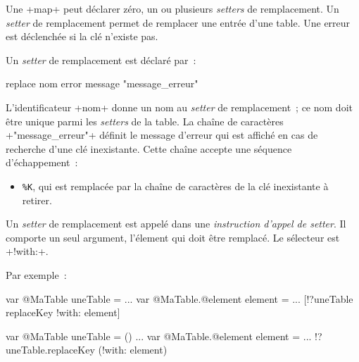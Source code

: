 Une \ggst+map+ peut déclarer zéro, un ou plusieurs \emph{setters} de remplacement. Un \emph{setter} de remplacement permet de remplacer une entrée d'une table. Une erreur est déclenchée si la clé n'existe pas.


Un \emph{setter} de remplacement est déclaré par~:

\begin{galgas3}
replace nom error message "message_erreur"
\end{galgas3}

\begin{galgas4}
\end{galgas4}

L'identificateur \ggst+nom+ donne un nom au \emph{setter} de remplacement~; ce nom doit être unique parmi les \emph{setters} de la table. La chaîne de caractères \ggst+"message_erreur"+ définit le message d'erreur qui est affiché en cas de recherche d'une clé inexistante. Cette chaîne accepte une séquence d'échappement~:
\begin{itemize}
  \item \texttt{\%K}, qui est remplacée par la chaîne de caractères de la clé inexistante à retirer.
\end{itemize}


Un \emph{setter} de remplacement est appelé dans une \emph{instruction d'appel de setter}. Il comporte un seul argument, l'élement qui doit être remplacé. Le sélecteur est \ggsq+!with:+.


Par exemple~:

\begin{galgas3}
var @MaTable uneTable = {}
...
var @MaTable.@element element = ...
[!?uneTable replaceKey !with: element]
\end{galgas3}


\begin{galgas4}
var @MaTable uneTable = ()
...
var @MaTable.@element element = ...
!?uneTable.replaceKey (!with: element)
\end{galgas4}








%
%

